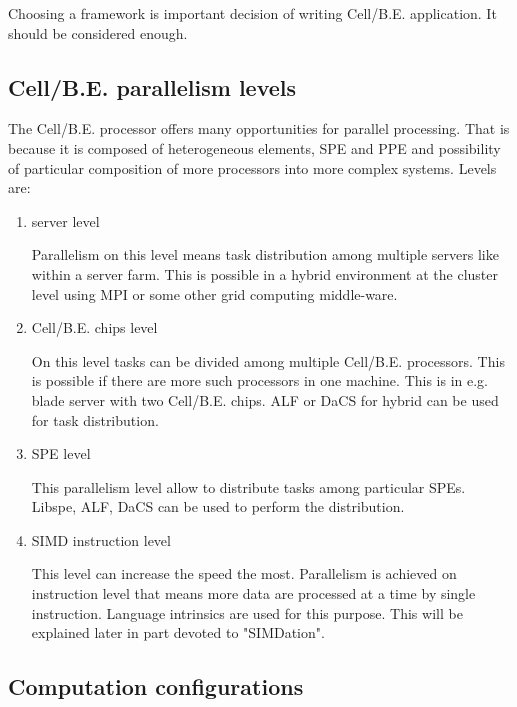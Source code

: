 Choosing a framework is important decision of writing Cell/B.E. application.
It should be considered enough.

\subsection {Cell/B.E. parallelism levels}

The Cell/B.E. processor offers many opportunities for parallel processing.
That is because it is composed of heterogeneous elements, SPE and PPE and possibility of particular composition of more processors into more complex systems.
 Levels are:
\begin{enumerate}
\item server level
\par
Parallelism on this level means task distribution among multiple servers like within a server farm.
This is possible in a hybrid environment at the cluster level using MPI or some other grid computing middle-ware.

\item Cell/B.E. chips level
\par
On this level tasks can be divided among multiple Cell/B.E. processors.
This is possible if there are more such processors in one machine.
This is in e.g. blade server with two Cell/B.E. chips.
ALF or DaCS for hybrid can be used for task distribution.

\item SPE level
\par
This parallelism level allow to distribute tasks among particular SPEs.
Libspe, ALF, DaCS can be used to perform the distribution.

\item SIMD instruction level
\par
This level can increase the speed the most.
Parallelism is achieved on instruction level that means more data are processed at a time by single instruction.
Language intrinsics are used for this purpose.
This will be explained later in part devoted to "SIMDation".
\end{enumerate}

\subsection{Computation configurations}


